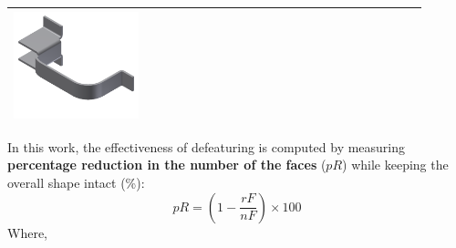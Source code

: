 \begin{minipage}[t]{0.9\linewidth}
\begin{tabular}[h]{@{} p{0.3\linewidth}| p{0.3\linewidth}|  p{0.3\linewidth}@{}}
\includegraphics[width=0.98\linewidth]{..//Common/images/DefeatBracketPhase_II_3} \\ \bottomrule

\end{tabular}
\label{fig:phaseII}
\end{minipage}

In this work, the effectiveness of defeaturing is computed by measuring {\bf percentage reduction in the number of the faces} ($pR$) while keeping the overall shape intact (\%):
	\begin{equation}\label{eqn:defeaturing:effectiveness}  pR = (1 - \frac{rF}{nF}) \times 100\end{equation}
	Where, 


